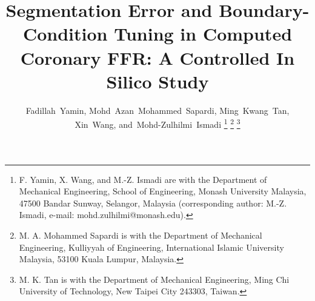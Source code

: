 \documentclass[journal,twoside,web]{ieeecolor}
\begin{document}

\title{Segmentation Error and Boundary-Condition Tuning in Computed Coronary FFR: A Controlled In Silico Study}

\author{Fadillah~Yamin,
        Mohd~Azan~Mohammed~Sapardi,
        Ming~Kwang~Tan,
        Xin~Wang,
        and~\mbox{Mohd-Zulhilmi~Ismadi}\endgraf\vspace{-\baselineskip}%
\thanks{F. Yamin, X. Wang, and M.-Z. Ismadi are with the Department of Mechanical Engineering, School of
Engineering, Monash University Malaysia, 47500 Bandar Sunway, Selangor, Malaysia (corresponding author:
M.-Z. Ismadi, e-mail: mohd.zulhilmi@monash.edu).}%
\thanks{M. A. Mohammed Sapardi is with the Department of Mechanical Engineering, Kulliyyah of Engineering,
International Islamic University Malaysia, 53100 Kuala Lumpur, Malaysia.}%
\thanks{M. K. Tan is with the Department of Mechanical Engineering, Ming Chi University of Technology, New Taipei
City 243303, Taiwan.}}


\maketitle
\end{document}
